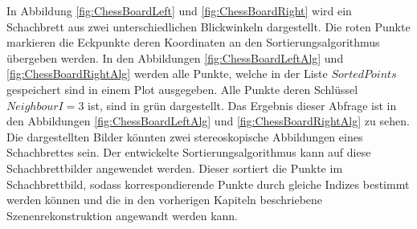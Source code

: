 In Abbildung \ref{fig:ChessBoardLeft} und \ref{fig:ChessBoardRight} wird ein Schachbrett aus zwei unterschiedlichen Blickwinkeln dargestellt. Die roten Punkte markieren die Eckpunkte deren Koordinaten an den Sortierungsalgorithmus übergeben werden. In den Abbildungen \ref{fig:ChessBoardLeftAlg} und \ref{fig:ChessBoardRightAlg} werden alle Punkte, welche in der Liste $SortedPoints$ gespeichert sind in einem Plot ausgegeben. Alle Punkte deren Schlüssel $NeighbourI = 3$ ist, sind in grün dargestellt. Das Ergebnis dieser Abfrage ist in den Abbildungen \ref{fig:ChessBoardLeftAlg} und \ref{fig:ChessBoardRightAlg} zu sehen. Die dargestellten Bilder könnten zwei stereoskopische Abbildungen eines Schachbrettes sein. Der entwickelte Sortierungsalgorithmus kann auf diese Schachbrettbilder angewendet werden. Dieser sortiert die Punkte im Schachbrettbild, sodass korrespondierende Punkte durch gleiche Indizes bestimmt werden können und die in den vorherigen Kapiteln beschriebene Szenenrekonstruktion angewandt werden kann. 





